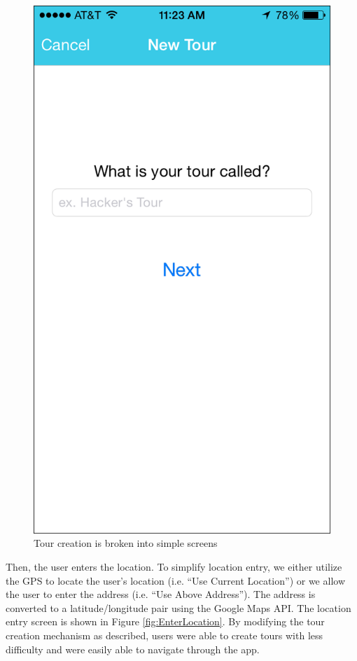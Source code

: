 \documentclass{sigchi}
\begin{document}
\begin{figure}
\centering
\includegraphics[width=0.7\linewidth]{./TourName}
\caption{Tour creation is broken into simple screens}
\label{fig:TourName}
\end{figure}

Then, the user enters the location. To simplify location entry, we either utilize the GPS to locate the user's location (i.e. ``Use Current Location'') or we allow the user to enter the address (i.e. ``Use Above Address''). The address is converted to a latitude/longitude pair using the Google Maps API. The location entry screen is shown in  Figure \ref{fig:EnterLocation}. By modifying the tour creation mechanism as described, users were able to create tours with less difficulty and were easily able to navigate through the app.
\end{document}
